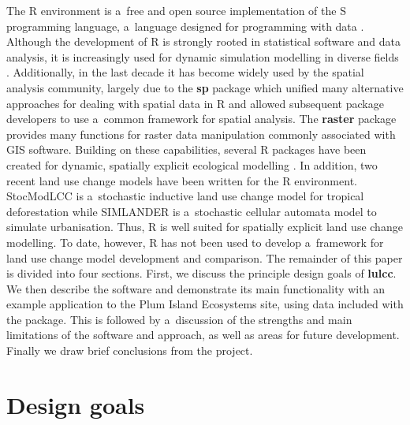 \documentclass{icldt}\usepackage[]{graphicx}\usepackage[]{color}
\begin{document}
The R environment is a~free and open source implementation of the S programming language, a~language designed for programming with data \citep{chambers2008}. Although the development of R is strongly rooted in statistical software and data analysis, it is increasingly used for dynamic simulation modelling in diverse fields \citep{petzoldt2007}. Additionally, in the last decade it has become widely used by the spatial analysis community, largely due to the \textbf{sp} package \citep{pebesma2005,bivand2013} which unified many alternative approaches for dealing with spatial data in R and allowed subsequent package developers to use a~common framework for spatial analysis. The \textbf{raster} package \citep{hijmans2014} provides many functions for raster data manipulation commonly associated with GIS software. Building on these capabilities, several R packages have been created for dynamic, spatially explicit ecological modelling \citep[e.g.][]{petzoldt2007,fiske2011}. In addition, two recent land use change models have been written for the R environment. StocModLCC \citep{rosa2013} is a~stochastic inductive land use change model for tropical deforestation while SIMLANDER \citep{hewitt2013} is a~stochastic cellular automata model to simulate urbanisation. Thus, R is well suited for spatially explicit land use change modelling. To date, however, R has not been used to develop a~framework for land use change model development and comparison. The remainder of this paper is divided into four sections. First, we discuss the principle design goals of \textbf{lulcc}. We then describe the software and demonstrate its main functionality with an example application to the Plum Island Ecosystems site, using data included with the package. This is followed by a~discussion of the strengths and main limitations of the software and approach, as well as areas for future development. Finally we draw brief conclusions from the project.
\\

\section{Design goals}
\end{document}
